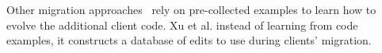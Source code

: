 % 
 
 Other migration approaches~\cite{6606596,10.1145/3387905.3388608,9079197} rely on pre-collected examples to learn how to evolve the additional client code. Xu et al. \cite{8813263} instead of learning from code examples, it constructs a database of edits to use during clients' migration. %
 
